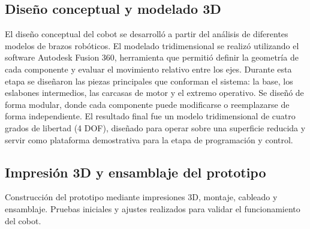 \subsection{Diseño conceptual y modelado 3D}

El diseño conceptual del cobot se desarrolló a partir del análisis de diferentes modelos de brazos robóticos. El modelado tridimensional se realizó utilizando el software Autodesk Fusion 360, herramienta que permitió definir la geometría de cada componente y evaluar el movimiento relativo entre los ejes. Durante esta etapa se diseñaron las piezas principales que conforman el sistema: la base, los eslabones intermedios, las carcasas de motor y el extremo operativo. Se diseñó de forma modular, donde cada componente puede modificarse o reemplazarse de forma independiente. El resultado final fue un modelo tridimensional de cuatro grados de libertad (4 DOF), diseñado para operar sobre una superficie reducida y servir como plataforma demostrativa para la etapa de programación y control.

\subsection{Impresión 3D y ensamblaje del prototipo}

Construcción del prototipo mediante impresiones 3D, montaje, cableado y ensamblaje. Pruebas iniciales y ajustes realizados para validar el funcionamiento del cobot.
